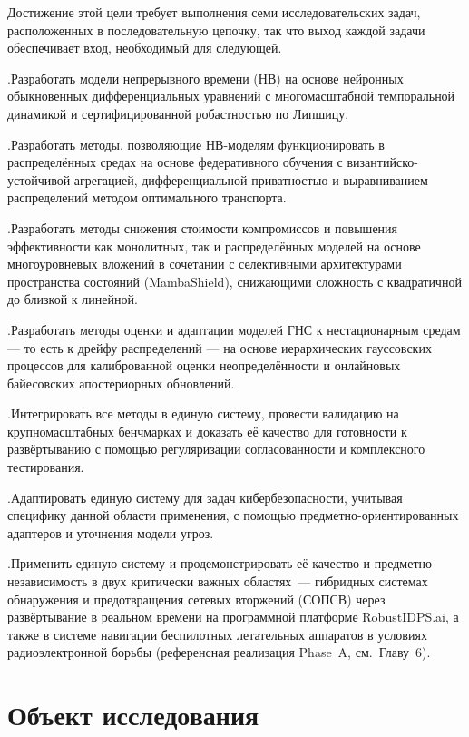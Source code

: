 Достижение этой цели требует выполнения семи исследовательских задач, расположенных в последовательную цепочку, так что выход каждой задачи обеспечивает вход, необходимый для следующей.

.\quad Разработать модели непрерывного времени (НВ) на основе нейронных обыкновенных дифференциальных уравнений с многомасштабной темпоральной динамикой и сертифицированной робастностью по Липшицу.

.\quad Разработать методы, позволяющие НВ-моделям функционировать в распределённых средах на основе федеративного обучения с византийско-устойчивой агрегацией, дифференциальной приватностью и выравниванием распределений методом оптимального транспорта.

.\quad Разработать методы снижения стоимости компромиссов и повышения эффективности как монолитных, так и распределённых моделей на основе многоуровневых вложений в сочетании с селективными архитектурами пространства состояний (MambaShield), снижающими сложность с квадратичной до близкой к линейной.

.\quad Разработать методы оценки и адаптации моделей ГНС к нестационарным средам --- то есть к дрейфу распределений --- на основе иерархических гауссовских процессов для калиброванной оценки неопределённости и онлайновых байесовских апостериорных обновлений.

.\quad Интегрировать все методы в единую систему, провести валидацию на крупномасштабных бенчмарках и доказать её качество для готовности к развёртыванию с помощью регуляризации согласованности и комплексного тестирования.

.\quad Адаптировать единую систему для задач кибербезопасности, учитывая специфику данной области применения, с помощью предметно-ориентированных адаптеров и уточнения модели угроз.

.\quad Применить единую систему и продемонстрировать её качество и предметно-независимость в двух критически важных областях~--- гибридных системах обнаружения и предотвращения сетевых вторжений (СОПСВ) через развёртывание в реальном времени на программной платформе \textsf{RobustIDPS.ai}, а также в системе навигации беспилотных летательных аппаратов в условиях радиоэлектронной борьбы (референсная реализация Phase~A, см.~Главу~6).


\section*{Объект исследования}

